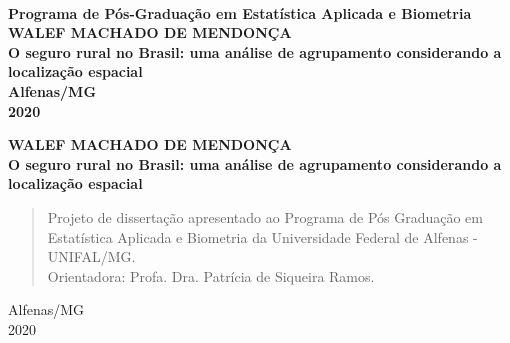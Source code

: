 \documentclass[12pt, a4paper,brazil,oneside]{article}
\begin{document}
	
	\onehalfspacing
	\thispagestyle{empty}
	\begin{center}
		\large{}\\
		\textbf{Programa de Pós-Graduação em Estatística Aplicada e Biometria}\\	
		
		\vspace{4cm}
		\textbf{WALEF MACHADO DE MENDONÇA}\\
		\vspace{6cm}
		\textbf{O seguro rural no Brasil: uma análise de agrupamento considerando a localização espacial}\\
		\vspace{9cm}
		\textbf{Alfenas/MG\\
			2020}
	\end{center}
	\newpage \thispagestyle{empty}
	\begin{center}
		\textbf{WALEF MACHADO DE MENDONÇA}
		\vspace{5cm}\\
		\textbf{O seguro rural no Brasil: uma análise de agrupamento considerando a localização espacial}\\
		\begin{flushright}
			\begin{minipage}{10cm}
				\begin{quote}
					\vspace{3cm}
					Projeto de dissertação apresentado ao Programa de Pós Graduação em Estatística Aplicada e Biometria da Universidade Federal de Alfenas - UNIFAL/MG. \\
					Orientadora: Profa. Dra. Patrícia de Siqueira Ramos. \\
				\end{quote}
			\end{minipage}
		\end{flushright}
		\vspace{8cm}
		Alfenas/MG\\2020
	\end{center}
	
	\newpage
	\listoftables
	\newpage
	\listoffigures
	\newpage
	\tableofcontents
	\newpage
\end{document}
